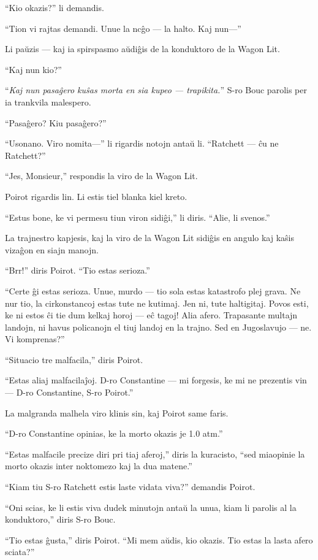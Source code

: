 ``Kio okazis?'' li demandis.

``Tion vi rajtas demandi. Unue la ncĝo --- la halto. Kaj nun---''

Li paŭzis --- kaj ia spirspasmo aŭdiĝis de la konduktoro de la Wagon Lit.

``Kaj nun kio?''

``\emph{Kaj nun pasaĝero kuŝas morta en sia kupeo --- trapikita.}'' S-ro Bouc parolis per ia trankvila malespero.

``Pasaĝero? Kiu pasaĝero?''

``Usonano. Viro nomita---'' li rigardis notojn antaŭ li. ``Ratchett --- ĉu ne Ratchett?''

``Jes, Monsieur,'' respondis la viro de la Wagon Lit.

Poirot rigardis lin. Li estis tiel blanka kiel kreto.

``Estus bone, ke vi permesu tiun viron sidiĝi,'' li diris. ``Alie, li svenos.''

La trajnestro kapjesis, kaj la viro de la Wagon Lit sidiĝis en angulo kaj kaŝis vizaĝon en siajn manojn.

``Brr!'' diris Poirot. ``Tio estas serioza.''

``Certe ĝi estas serioza. Unue, murdo --- tio sola estas katastrofo plej grava. Ne nur tio, la cirkonstancoj estas tute ne kutimaj. Jen ni, tute haltigitaj. Povos esti, ke ni estos ĉi tie dum kelkaj horoj --- eĉ tagoj! Alia afero. Trapasante multajn landojn, ni havus policanojn el tiuj landoj en la trajno. Sed en Jugoslavujo --- ne. Vi komprenas?''

``Situacio tre malfacila,'' diris Poirot.

``Estas aliaj malfacilaĵoj. D-ro Constantine --- mi forgesis, ke mi ne prezentis vin --- D-ro Constantine, S-ro Poirot.''

La malgranda malhela viro klinis sin, kaj Poirot same faris.

``D-ro Constantine opinias, ke la morto okazis je 1.0 atm.''

``Estas malfacile precize diri pri tiaj aferoj,'' diris la kuracisto, ``sed miaopinie la morto okazis inter noktomezo kaj la dua matene.''

``Kiam tiu S-ro Ratchett estis laste vidata viva?'' demandis Poirot.

``Oni scias, ke li estis viva dudek minutojn antaŭ la unua, kiam li parolis al la konduktoro,'' diris S-ro Bouc.

``Tio estas ĝusta,'' diris Poirot. ``Mi mem aŭdis, kio okazis. Tio estas la lasta afero sciata?''

